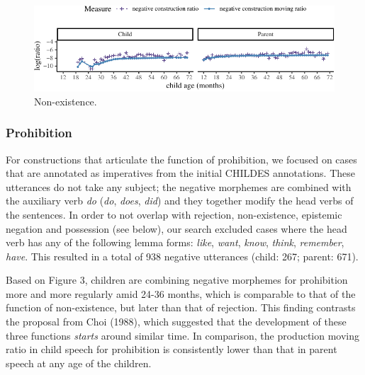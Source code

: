 \documentclass[10pt, letterpaper]{article}
\newenvironment{CodeChunk}{}{}
\begin{document}
\begin{figure}[h]

\begin{CodeChunk}


\begin{center}\includegraphics{figs/existence-1} \end{center}

\end{CodeChunk}
\caption[This image spans both columns]{Non-existence.}\label{fig:non-existence}
\end{figure}

\hypertarget{prohibition}{%
\subsubsection{Prohibition}\label{prohibition}}

For constructions that articulate the function of prohibition, we
focused on cases that are annotated as imperatives from the initial
CHILDES annotations. These utterances do not take any subject; the
negative morphemes are combined with the auxiliary verb \emph{do}
(\emph{do}, \emph{does}, \emph{did}) and they together modify the head
verbs of the sentences. In order to not overlap with rejection,
non-existence, epistemic negation and possession (see below), our search
excluded cases where the head verb has any of the following lemma forms:
\emph{like}, \emph{want}, \emph{know}, \emph{think}, \emph{remember},
\emph{have}. This resulted in a total of 938 negative utterances (child:
267; parent: 671).

Based on Figure 3, children are combining negative morphemes for
prohibition more and more regularly amid 24-36 months, which is
comparable to that of the function of non-existence, but later than that
of rejection. This finding contrasts the proposal from Choi (1988),
which suggested that the development of these three functions
\emph{starts} around similar time. In comparison, the production moving
ratio in child speech for prohibition is consistently lower than that in
parent speech at any age of the children.
\end{document}
